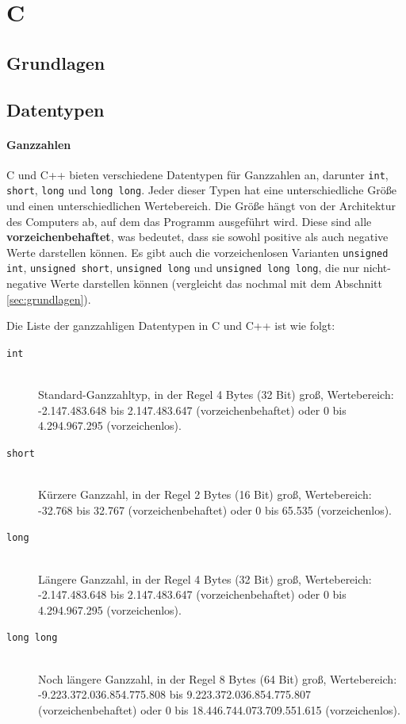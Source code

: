\section{C}
\label{sec:referenz:c}

\subsection{Grundlagen}

\subsection{Datentypen}
\label{sec:referenz:c:datentypen}

\paragraph{Ganzzahlen}
C und C++ bieten verschiedene Datentypen für Ganzzahlen an, darunter \texttt{int}, \texttt{short}, \texttt{long} und \texttt{long long}. Jeder dieser Typen hat eine unterschiedliche Größe und einen unterschiedlichen Wertebereich. Die Größe hängt von der Architektur des Computers ab, auf dem das Programm ausgeführt wird. Diese sind alle \textbf{vorzeichenbehaftet}, was bedeutet, dass sie sowohl positive als auch negative Werte darstellen können. Es gibt auch die vorzeichenlosen Varianten \texttt{unsigned int}, \texttt{unsigned short}, \texttt{unsigned long} und \texttt{unsigned long long}, die nur nicht-negative Werte darstellen können (vergleicht das nochmal mit dem Abschnitt \ref{sec:grundlagen}).

Die Liste der ganzzahligen Datentypen in C und C++ ist wie folgt:
\begin{description}
  \item[\texttt{int}]\hfill\\
   Standard-Ganzzahltyp, in der Regel 4 Bytes (32 Bit) groß, Wertebereich: -2.147.483.648 bis 2.147.483.647 (vorzeichenbehaftet) oder 0 bis 4.294.967.295 (vorzeichenlos).
  \item[\texttt{short}]\hfill\\
   Kürzere Ganzzahl, in der Regel 2 Bytes (16 Bit) groß, Wertebereich: -32.768 bis 32.767 (vorzeichenbehaftet) oder 0 bis 65.535 (vorzeichenlos).
  \item[\texttt{long}]\hfill\\
   Längere Ganzzahl, in der Regel 4 Bytes (32 Bit) groß, Wertebereich: -2.147.483.648 bis 2.147.483.647 (vorzeichenbehaftet) oder 0 bis 4.294.967.295 (vorzeichenlos).
  \item[\texttt{long long}]\hfill\\
   Noch längere Ganzzahl, in der Regel 8 Bytes (64 Bit) groß, Wertebereich: -9.223.372.036.854.775.808 bis 9.223.372.036.854.775.807 (vorzeichenbehaftet) oder 0 bis 18.446.744.073.709.551.615 (vorzeichenlos).
\end{description}

